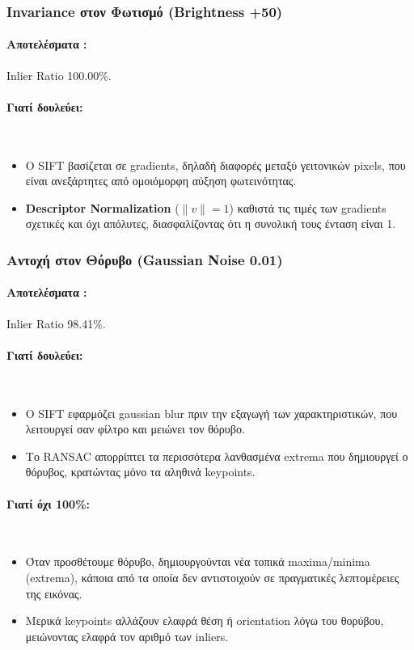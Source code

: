 \documentclass[12pt]{article}
\begin{document}
\subsubsection{Invariance στον Φωτισμό (Brightness +50)}
\paragraph{Αποτελέσματα : }Inlier Ratio 100.00\%.
\mbox{}\\


\paragraph{Γιατί δουλεύει:}
\mbox{}\\
\begin{itemize}
  \item Ο SIFT βασίζεται σε gradients, δηλαδή διαφορές μεταξύ γειτονικών pixels, που είναι ανεξάρτητες από ομοιόμορφη αύξηση φωτεινότητας.
  \item \textbf{Descriptor Normalization} ($\|v\| = 1$) καθιστά τις τιμές των gradients σχετικές και όχι απόλυτες, διασφαλίζοντας ότι η συνολική τους ένταση είναι 1.
\end{itemize}


\subsubsection{Αντοχή στον Θόρυβο (Gaussian Noise 0.01)}
\paragraph{Αποτελέσματα : }Inlier Ratio 98.41\%.
\mbox{}\\

\paragraph{Γιατί δουλεύει:}
\mbox{}\\
\begin{itemize}
  \item Ο SIFT εφαρμόζει gaussian blur πριν την εξαγωγή των χαρακτηριστικών, που λειτουργεί σαν φίλτρο και μειώνει τον θόρυβο.
  \item Το RANSAC απορρίπτει τα περισσότερα λανθασμένα extrema που δημιουργεί ο θόρυβος, κρατώντας μόνο τα αληθινά keypoints.
\end{itemize}

\paragraph{Γιατί όχι 100\%:}
\mbox{}\\
\begin{itemize}
  \item Όταν προσθέτουμε θόρυβο, δημιουργούνται νέα τοπικά maxima/minima (extrema),
   κάποια από τα οποία δεν αντιστοιχούν σε πραγματικές λεπτομέρειες της εικόνας.
  \item Μερικά keypoints αλλάζουν ελαφρά θέση ή orientation λόγω του θορύβου, μειώνοντας ελαφρά τον αριθμό των inliers.
\end{itemize}
\end{document}
